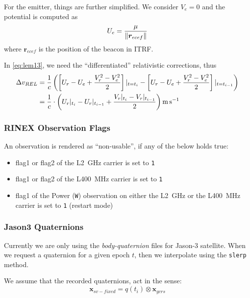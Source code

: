 For the emitter, things are further simplified. We consider $V_e = 0$ and the 
potential is computed as 
\begin{equation}
  U_e = \frac{\mu}{\lVert\bm{r}_{ecef}\rVert}
  \label{eq:potential-emitter}
\end{equation}
where $\bm{r}_{ecef}$ is the position of the beacon in ITRF.

In \ref{eq:lem13}, we need the ``differentiated'' relativistic corrections, thus 
\begin{equation}
  \label{eq:drel-diff}
  \begin{aligned}
    \Delta v_{REL} &= \frac{1}{c} \left( \left[ U_r - U_e + \frac{V^2_r - V^2_e}{2} \right]\at{t=t_i} - \left[ U_r - U_e + \frac{V^2_r - V^2_e}{2} \right]\at{t=t_{i-1}} \right) \\
      &= \frac{1}{c} \cdot \left( U_r\at{t_i} - U_r\at{t_{i-1}} +  \frac{V_r\at{t_i}-V_r\at{t_{i-1}}}{2} \right) \si{\m\per\s}
  \end{aligned}
\end{equation}

\subsubsection{RINEX Observation Flags}
\label{sssec:rnx-flags}
An observation is rendered as ``non-usable'', if any of the below holds true:
\begin{itemize}
  \item flag1 or flag2 of the L\SI{2}{\giga\hertz} carrier is set to \texttt{1}
  \item flag1 or flag2 of the L\SI{400}{\mega\hertz} carrier is set to \texttt{1}
  \item flag1 of the Power (\texttt{W}) observation on either the L\SI{2}{\giga\hertz} 
    or the L\SI{400}{\mega\hertz} carrier is set to \texttt{1} (restart mode)
\end{itemize}

\subsubsection{Jason3 Quaternions}
\label{sssec:ja3-quaternions}
Currently we are only using the \emph{body-quaternion} files for Jason-3 
satellite. When we request a quaternion for a given epoch $t$, then we interpolate 
using the \texttt{slerp} method. 

We assume that the recorded quaternions, act in the sense:
\begin{equation}
  \bm{x}_{sv-fixed} = q(t_i) \otimes \bm{x}_{gcrs}
\end{equation}

